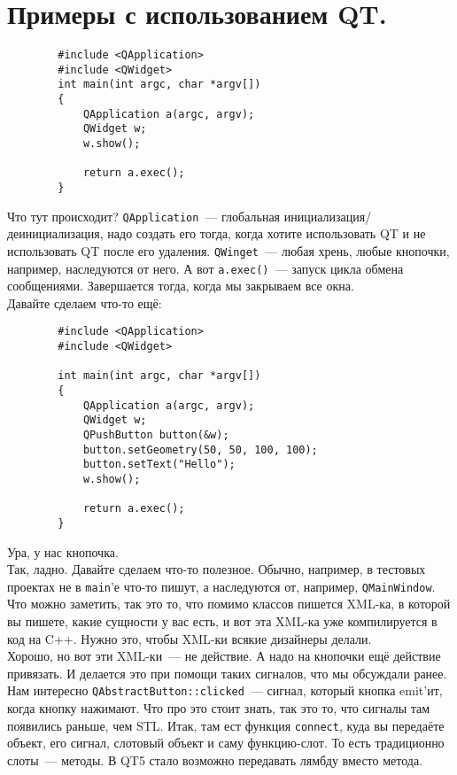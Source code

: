 \documentclass{article}
\begin{document}
    \section{Примеры с использованием QT.}
    \begin{verbatim}
        #include <QApplication>
        #include <QWidget>
        int main(int argc, char *argv[])
        {
            QApplication a(argc, argv);
            QWidget w;
            w.show();
            
            return a.exec();
        }
    \end{verbatim}
    Что тут происходит? \texttt{QApplication}~--- глобальная инициализация/деинициализация, надо создать его тогда, когда хотите использовать QT и не использовать QT после его удаления. \texttt{QWinget}~--- любая хрень, любые кнопочки, например, наследуются от него. А вот \texttt{a.exec()}~--- запуск цикла обмена сообщениями. Завершается тогда, когда мы закрываем все окна.\\
    Давайте сделаем что-то ещё:
    \begin{verbatim}
        #include <QApplication>
        #include <QWidget>

        int main(int argc, char *argv[])
        {
            QApplication a(argc, argv);
            QWidget w;
            QPushButton button(&w);
            button.setGeometry(50, 50, 100, 100);
            button.setText("Hello");
            w.show();
            
            return a.exec();
        }
    \end{verbatim}
    Ура, у нас кнопочка.\\
    Так, ладно. Давайте сделаем что-то полезное. Обычно, например, в тестовых проектах не в \texttt{main}'е что-то пишут, а наследуются от, например, \texttt{QMainWindow}. Что можно заметить, так это то, что помимо классов пишется XML-ка, в которой вы пишете, какие сущности у вас есть, и вот эта XML-ка уже компилируется в код на C++. Нужно это, чтобы XML-ки всякие дизайнеры делали.\\
    Хорошо, но вот эти XML-ки~--- не действие. А надо на кнопочки ещё действие привязать. И делается это при помощи таких сигналов, что мы обсуждали ранее. Нам интересно \texttt{QAbstractButton::clicked}~--- сигнал, который кнопка emit'ит, когда кнопку нажимают. Что про это стоит знать, так это то, что сигналы там появились раньше, чем STL. Итак, там ест функция \texttt{connect}, куда вы передаёте объект, его сигнал, слотовый объект и саму функцию-слот. То есть традиционно слоты~--- методы. В QT5 стало возможно передавать лямбду вместо метода.\\
\end{document}
